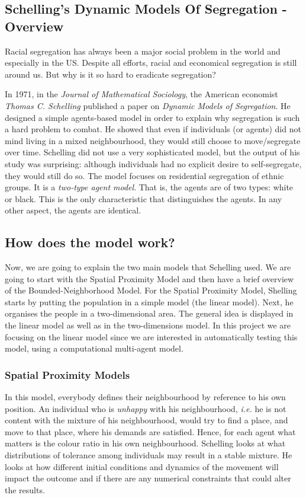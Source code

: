 \documentclass[../main.tex]{subfiles}
\begin{document}
\subsection{Schelling's Dynamic Models Of Segregation - Overview}
Racial segregation has always been a major social problem in the world and especially in the US. Despite all efforts, racial and economical segregation is still around us. But why is it so hard to eradicate segregation?

In 1971, in the \textit{Journal of Mathematical Sociology}, the American economist \textit{Thomas C. Schelling} published a paper on \textit{Dynamic Models of Segregation}. He designed a simple agents-based model in order to explain why segregation is such a hard problem to combat. He showed that even if individuals (or agents) did not mind living in a mixed neighbourhood, they would still choose to move/segregate over time. Schelling did not use a very sophisticated model, but the output of his study was surprising: although individuals had no explicit desire to self-segregate, they would still do so. The model focuses on residential segregation of ethnic groups. It is a \textit{two-type agent model}. That is, the agents are of two types: white or black. This is the only characteristic that distinguishes the agents. In any other aspect, the agents are identical.

\subsection{How does the model work?}
Now, we are going to explain the two main models that Schelling used. We are going to start with the Spatial Proximity Model and then have a brief overview of the Bounded-Neighborhood Model. For the Spatial Proximity Model, Shelling starts by putting the population in a simple model (the linear model). Next, he organises the people in a  two-dimensional area. The general idea is displayed in the linear model as well as in the two-dimensions model. In this project we are focusing on the linear model since we are interested in automatically testing this model, using a computational multi-agent model.

\subsubsection{Spatial Proximity Models}
 In this model, everybody defines their neighbourhood by reference to his own position. An individual who is \textit{unhappy} with his neighbourhood, \textit{i.e.} he is not content with the mixture of his neighbourhood, would try to find a place, and move to that place, where his demands are satisfied. Hence, for each agent what matters is the colour ratio in his own neighbourhood. Schelling looks at what distributions of tolerance among individuals may result in a stable mixture. He looks at how different initial conditions and dynamics of the movement will impact the outcome and if there are any numerical constraints that could alter the results.
\end{document}
